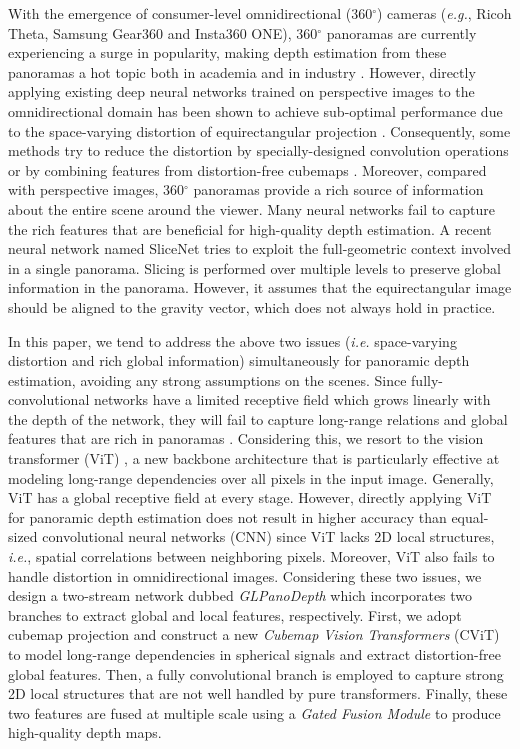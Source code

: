 \documentclass[10pt,twocolumn,letterpaper]{article}
\begin{document}
With the emergence of consumer-level omnidirectional (360$^\circ$) cameras (\emph{e.g.}, Ricoh Theta, Samsung Gear360 and Insta360 ONE), 360$^\circ$ panoramas are currently experiencing a surge in popularity, making depth estimation from these panoramas a hot topic both in academia and in industry \cite{3D60,8885706,8885718,9157424,9157410,10.1007/978-3-030-58517-4_39,Wang_2019_ICRA,9320332,9353978,Sun_2021_CVPR,Pintore_2021_CVPR}. However, directly applying existing deep neural networks trained on perspective images to the omnidirectional domain has been shown to achieve sub-optimal performance due to the space-varying distortion of equirectangular projection \cite{10.1007/978-3-030-01270-0_43,3D60}. Consequently, 
some methods try to reduce the distortion by specially-designed convolution operations \cite{10.1007/978-3-030-01270-0_43} or by combining features from distortion-free cubemaps \cite{9157424,9353978}. Moreover, compared with perspective images, 360$^\circ$ panoramas provide a rich source of information about the entire scene around the viewer. Many neural networks fail to capture the rich features \cite{10.1007/978-3-319-10599-4_43} that are beneficial for high-quality depth estimation. A recent neural network named SliceNet \cite{Pintore_2021_CVPR} tries to exploit the full-geometric context involved in a single panorama. Slicing is performed over multiple levels to preserve global information in the panorama. However, it assumes that the equirectangular image should be aligned to the gravity vector, which does not always hold in practice.

In this paper, we tend to address the above two issues (\emph{i.e.} space-varying distortion and rich global information) simultaneously for panoramic depth estimation, avoiding any strong assumptions on the scenes. Since fully-convolutional networks have a limited receptive field which grows linearly with the depth of the network, they will fail to capture long-range relations and global features that are rich in panoramas \cite{10.1007/978-3-319-10599-4_43}. Considering this, we resort to the vision transformer (ViT) \cite{vit}, a new backbone architecture that is particularly effective at modeling long-range dependencies over all pixels in the input image. Generally, ViT has a global receptive field at every stage. However, directly applying ViT for panoramic depth estimation does not result in higher accuracy than equal-sized convolutional neural networks (CNN) since ViT lacks 2D local structures, \emph{i.e.}, spatial correlations between neighboring pixels. Moreover, ViT also fails to handle distortion in omnidirectional images. Considering these two issues, we design a two-stream network dubbed \emph{GLPanoDepth} which incorporates two branches to extract global and local features, respectively. First, we adopt cubemap projection and construct a new \emph{Cubemap Vision Transformers} (CViT) to model long-range dependencies in spherical signals and extract distortion-free global features. Then, a fully convolutional branch is employed to capture strong 2D local structures that are not well handled by pure transformers. Finally, these two features are fused at multiple scale using a \emph{Gated Fusion Module} to produce high-quality depth maps. 
\end{document}
